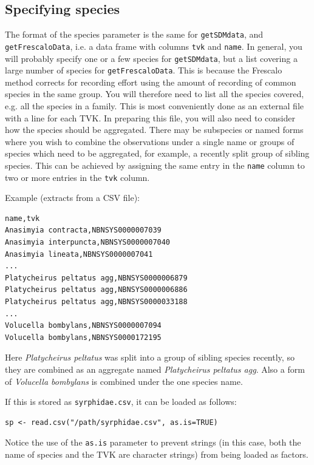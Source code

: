 \documentclass{article}
\begin{document}
\subsection{Specifying species}
The format of the species parameter is the same for \texttt{getSDMdata},
and \texttt{getFrescaloData}, i.e. a data frame with columns \texttt{tvk} and
\texttt{name}. In general, you will probably specify one or a few species for
\texttt{getSDMdata},
but a list covering a large number of species for \texttt{getFrescaloData}. This is
because the Frescalo method corrects for recording effort using the amount of
recording of common species in the same group. You will therefore need to list
all the species covered, e.g. all the species in a family. This is most 
conveniently done as an external file with a line for each TVK. In preparing this
file, you will also need to consider how the species should be aggregated. There
may be subspecies or named forms where you wish to combine 
the observations under a single name or groups of species which need to be 
aggregated, for example, a recently split group of sibling species. This can be 
achieved by assigning the same entry in the \texttt{name} column to two or 
more entries in the \texttt{tvk} column. 

Example (extracts from a CSV file):
 
\begin{verbatim}
name,tvk
Anasimyia contracta,NBNSYS0000007039
Anasimyia interpuncta,NBNSYS0000007040
Anasimyia lineata,NBNSYS0000007041
...
Platycheirus peltatus agg,NBNSYS0000006879
Platycheirus peltatus agg,NBNSYS0000006886
Platycheirus peltatus agg,NBNSYS0000033188
...
Volucella bombylans,NBNSYS0000007094
Volucella bombylans,NBNSYS0000172195
\end{verbatim}

Here \emph{Platycheirus peltatus} was split into a group of sibling species 
recently, so they are combined as an aggregate named \emph{Platycheirus 
peltatus agg}. Also a form of \emph{Volucella bombylans} is combined under 
the one species name.

If this is stored as \texttt{syrphidae.csv}, it can be loaded as follows:
\begin{verbatim}
sp <- read.csv("/path/syrphidae.csv", as.is=TRUE)
\end{verbatim}

Notice the use of the \texttt{as.is} parameter to prevent strings (in this case,
both the name of species and the TVK are character strings) from being loaded as
factors. 
\end{document}
